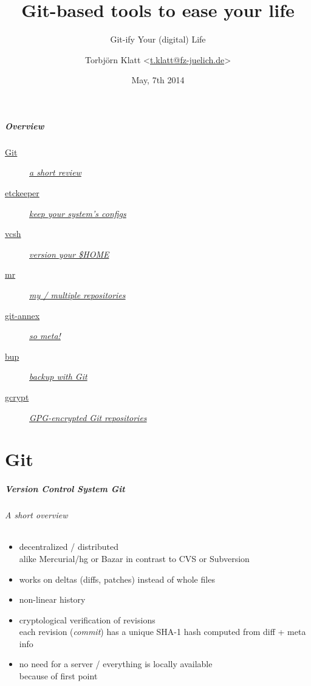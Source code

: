 \documentclass[english,hyperref={pdfpagelabels=false},aspectratio=169]{beamer}
\title{Git-based tools to ease your life}
\subtitle{Git-ify Your (digital) Life}
\author{Torbjörn Klatt <\href{mailto:t.klatt@fz-juelich.de}{t.klatt@fz-juelich.de}>}
\institute{JSC Internal Seminar}
\date{May, 7th 2014}
\begin{document}
\maketitle

\begin{frame}
  \frametitle{Overview}
  \begin{description}
    \item[\hyperlink{git}{Git}] \hyperlink{git}{\textit{a short review}}
    \item[\hyperlink{etckeeper}{etckeeper}] \hyperlink{etckeeper}{\textit{keep your system's configs}}
    \item[\hyperlink{vcsh}{vcsh}] \hyperlink{vcsh}{\textit{version your \$HOME}}
    \item[\hyperlink{mr}{mr}] \hyperlink{mr}{\textit{my / multiple repositories}}
    \item[\hyperlink{gitannex}{git-annex}] \hyperlink{gitannex}{\textit{so meta!}}
    \item[\hyperlink{bup}{bup}] \hyperlink{bup}{\textit{backup with Git}}
    \item[\hyperlink{gcrypt}{gcrypt}] \hyperlink{gcrypt}{\textit{GPG-encrypted Git repositories}}
  \end{description}
\end{frame}


\part{Git}
\makepart

\begin{frame}[label=git]
  \frametitle{Version Control System \textit{Git}}
  \framesubtitle{A short overview}
  \begin{itemize}
    \item decentralized / distributed\\
      {\scriptsize alike Mercurial/hg or Bazar in contrast to CVS or Subversion}
    \item works on deltas {\scriptsize\color{fzjgray50}(diffs, patches)} instead of whole files
    \item non-linear history
    \item cryptological verification of revisions\\
      {\scriptsize each revision (\textit{commit}) has a unique SHA-1 hash computed from diff + meta info}
    \item no need for a server / everything is locally available\\
      {\scriptsize because of first point}
  \end{itemize}
\end{frame}
\end{document}
